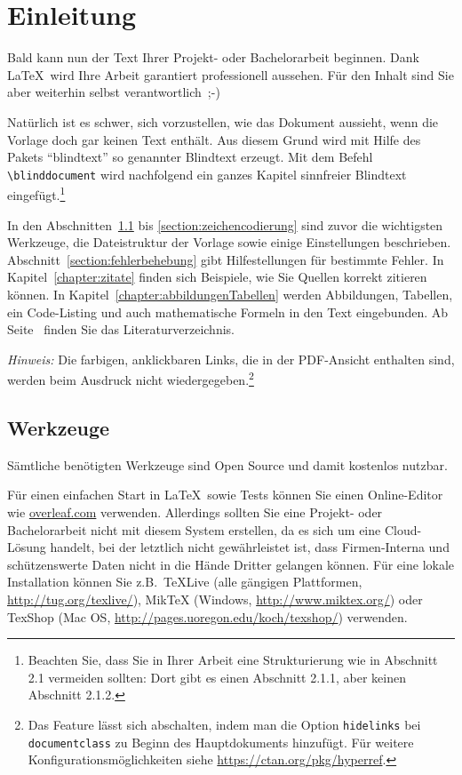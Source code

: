 \chapter{Einleitung}

Bald kann nun der Text Ihrer Projekt- oder Bachelorarbeit beginnen. Dank \LaTeX\ wird Ihre Arbeit garantiert professionell aussehen. Für den Inhalt sind Sie aber weiterhin selbst verantwortlich~\mbox{;-)}

Natürlich ist es schwer, sich vorzustellen, wie das Dokument aussieht, wenn die Vorlage doch gar keinen Text enthält. Aus diesem Grund wird mit Hilfe des Pakets \enquote{blindtext} so genannter Blindtext erzeugt. Mit dem Befehl \verb|\blinddocument| wird nachfolgend ein ganzes Kapitel sinnfreier Blindtext eingefügt.\footnote{Beachten Sie, dass Sie in Ihrer Arbeit eine Strukturierung wie in Abschnitt 2.1 vermeiden sollten: Dort gibt es einen Abschnitt 2.1.1, aber keinen Abschnitt 2.1.2.} 

In den Abschnitten~\ref{section:werkzeuge} bis \ref{section:zeichencodierung} sind zuvor die wichtigsten Werkzeuge, die Dateistruktur der Vorlage sowie einige Einstellungen beschrieben. Abschnitt~\ref{section:fehlerbehebung} gibt Hilfestellungen für bestimmte Fehler. In Kapitel~\ref{chapter:zitate} finden sich Beispiele, wie Sie Quellen korrekt zitieren können. In Kapitel~\ref{chapter:abbildungenTabellen} werden Abbildungen, Tabellen, ein Code-Listing und auch mathematische Formeln in den Text eingebunden. Ab Seite~\pageref{chapter:quellen} finden Sie das Literaturverzeichnis.

\emph{Hinweis:} Die farbigen, anklickbaren Links, die in der PDF-Ansicht enthalten sind, werden beim Ausdruck nicht wiedergegeben.\footnote{Das Feature lässt sich abschalten, indem man die Option \texttt{hidelinks} bei \texttt{documentclass} zu Beginn des Hauptdokuments hinzufügt. Für weitere Konfigurationsmöglichkeiten siehe \url{https://ctan.org/pkg/hyperref}.}

\section{Werkzeuge}\label{section:werkzeuge}

Sämtliche benötigten Werkzeuge sind Open Source und damit kostenlos nutzbar.

Für einen einfachen Start in \LaTeX\ sowie Tests können Sie einen Online-Editor wie \url{overleaf.com} verwenden. Allerdings sollten Sie eine Projekt- oder Bachelorarbeit nicht mit diesem System erstellen, da es sich um eine Cloud-Lösung handelt, bei der letztlich nicht gewährleistet ist, dass Firmen-Interna und schützenswerte Daten nicht in die Hände Dritter gelangen können. Für eine lokale Installation können Sie z.B.\ TeXLive (alle gängigen Plattformen, \url{http://tug.org/texlive/}), MikTeX (Windows, \url{http://www.miktex.org/}) oder TexShop (Mac OS, \url{http://pages.uoregon.edu/koch/texshop/}) verwenden.

